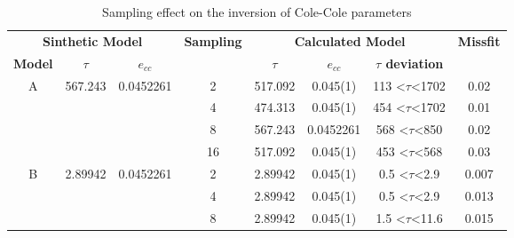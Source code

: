 \documentclass{vie16}
\begin{document}
\begin{table}[H]
\centering
\caption{Sampling effect on the inversion of Cole-Cole parameters}
\label{t:INV-sample_effect}
\begin{adjustbox}{scale=0.9}
\begin{tabular}{@{}|c|c|c|c|c|c|c|c|@{}}
\multicolumn{3}{|c|}{\textbf{Sinthetic Model}}                             & \multirow{2}{*}{\textbf{Sampling}} & \multicolumn{3}{c|}{\textbf{Calculated Model}}                          & \multirow{2}{*}{\textbf{Missfit}}    \\
\textbf{Model}     & \textbf{$\tau$}          & \textbf{$e_{cc}$}          &                                    & \textbf{$\tau$} & \textbf{$e_{cc}$} & \textbf{$\tau$ deviation}         &                                      \\ \hline
\multirow{4}{*}{A} & \multirow{4}{*}{567.243} & \multirow{4}{*}{0.0452261} & 2                                  & 517.092         & 0.045(1)          & 113 \textless$\tau$\textless 1702 & 0.02                                 \\
                   &                          &                            & 4                                  & 474.313         & 0.045(1)          & 454 \textless$\tau$\textless 1702 & 0.01                                 \\
                   &                          &                            & 8                                  & 567.243         & 0.0452261         & 568 \textless$\tau$\textless 850  & 0.02                                 \\
                   &                          &                            & 16                                 & 517.092         & 0.045(1)          & 453 \textless$\tau$\textless 568  & 0.03                                 \\ \hline
\multirow{4}{*}{B} & \multirow{4}{*}{2.89942} & \multirow{4}{*}{0.0452261} & 2                                  & 2.89942         & 0.045(1)          & 0.5 \textless$\tau$\textless 2.9  & 0.007                                \\
                   &                          &                            & 4                                  & 2.89942         & 0.045(1)          & 0.5 \textless$\tau$\textless 2.9  & 0.013                                \\
                   &                          &                            & 8                                  & 2.89942         & 0.045(1)          & 1.5 \textless$\tau$\textless 11.6 & 0.015                                \\

\end{tabular}
\end{adjustbox}
\end{table}
\end{document}

